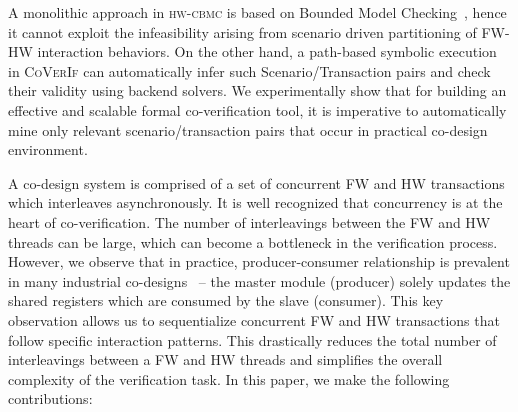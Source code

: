 \documentclass[sigconf]{acmart}
\newcommand{\tool}[1]{\textsc{#1}\xspace}
\newcommand{\hwcbmcv}{\tool{hw-cbmc}}
\newcommand{\verifox}{\tool{CoVerIf}}
\begin{document}
A monolithic approach in \hwcbmcv is based on Bounded Model Checking~\cite{CKY03}, 
hence it cannot exploit the infeasibility arising from scenario driven
partitioning of FW-HW interaction behaviors.  On the other hand, a 
path-based symbolic execution in \verifox can automatically infer 
such Scenario/Transaction pairs and check their validity using backend 
solvers.  We experimentally show that for building an effective and 
scalable formal co-verification tool, it is imperative to automatically 
mine only relevant scenario/transaction pairs that occur in practical 
co-design environment. 
%


A co-design system is comprised of a set of concurrent FW and HW transactions 
which interleaves asynchronously. It is well recognized that concurrency is at
the heart of co-verification. The number of interleavings between the FW
and HW threads can be large, which can become a bottleneck in the
verification process.  However, we observe that in practice, 
producer-consumer relationship is prevalent in many industrial 
co-designs~\cite{polig2014micro,polig2014fpl,giefers2015accelerating} --
the master module (producer) solely updates the shared registers which are
consumed by the slave (consumer).  This key observation allows us to
sequentialize concurrent FW and HW transactions that follow specific interaction
patterns.  This drastically reduces the total number of interleavings 
between a FW and HW threads and simplifies the overall complexity of the 
verification task. 
%
In this paper, we make the following contributions:
\end{document}
